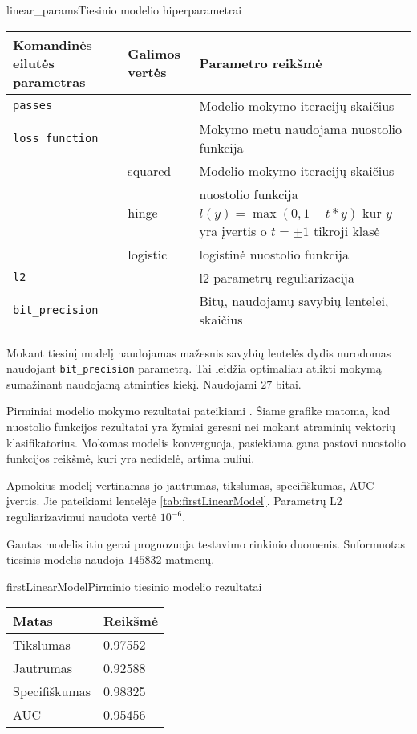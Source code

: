 \begin{ktutable}{linear_params}{Tiesinio modelio hiperparametrai}
    \begin{tabular}{| l | l | p{7cm}|}
    \hline
        Komandinės eilutės parametras & Galimos vertės & Parametro reikšmė\\ \hline
        \texttt{passes} &  & Modelio mokymo iteracijų skaičius \\ \hline
        \texttt{loss\_function} &          & Mokymo metu naudojama nuostolio funkcija \\
                               & squared  & Modelio mokymo iteracijų skaičius \\
                               & hinge    & nuostolio funkcija $l(y) = \max(0, 1 - t * y)$ kur $y$ yra įvertis o $t = \pm 1$ tikroji klasė  \\
                               & logistic & logistinė nuostolio funkcija \\ \hline
        \texttt{l2} & & l2 parametrų reguliarizacija \\ \hline
        \texttt{bit\_precision} & & Bitų, naudojamų savybių lentelei, skaičius\\ \hline
    \end{tabular}
\end{ktutable}

Mokant tiesinį modelį naudojamas mažesnis savybių lentelės dydis nurodomas naudojant \texttt{bit\_precision}
 parametrą. Tai leidžia optimaliau atlikti mokymą sumažinant naudojamą atminties kiekį. Naudojami $27$ bitai.

Pirminiai modelio mokymo rezultatai pateikiami . Šiame grafike
matoma, kad nuostolio funkcijos rezultatai yra žymiai geresni nei mokant atraminių vektorių klasifikatorius. Mokomas modelis konverguoja, pasiekiama gana pastovi nuostolio funkcijos reikšmė, kuri
yra nedidelė, artima nuliui.


Apmokius modelį vertinamas jo jautrumas, tikslumas, specifiškumas, AUC įvertis. Jie pateikiami
lentelėje \vref{tab:firstLinearModel}. Parametrų L2 reguliarizavimui naudota vertė $10^{-6}$.

Gautas modelis itin gerai prognozuoja testavimo rinkinio duomenis. Suformuotas tiesinis modelis naudoja
$145832$ matmenų.

\begin{ktutable}{firstLinearModel}{Pirminio tiesinio modelio rezultatai}
    \begin{tabular}{| l | l |}
    \hline
       Matas & Reikšmė \\ \hline
               Tikslumas & 0.97552 \\ \hline
               Jautrumas & 0.92588 \\ \hline
               Specifiškumas & 0.98325 \\ \hline
               AUC & 0.95456 \\ \hline
    \end{tabular}
\end{ktutable}

